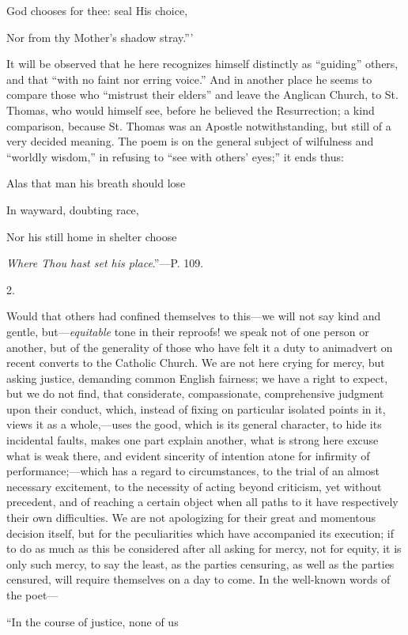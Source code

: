 God chooses for thee: seal His choice,

Nor from thy
Mother's shadow stray.'''

It will be observed that he here recognizes
himself distinctly as ``guiding'' others, and that ``with no faint nor
erring voice.'' And in another place he seems to compare those who ``mistrust
their elders'' and leave the Anglican Church, to St. Thomas, who would
himself see, before he believed the Resurrection; a kind comparison,
because St. Thomas was an Apostle notwithstanding, but still of a very
decided meaning. The poem is on the general subject of wilfulness and ``worldly
wisdom,'' in refusing to ``see with others' eyes;'' it ends thus:

Alas that
man his breath should lose

In wayward,
doubting race,

Nor his still home in shelter choose

\emph{Where
Thou hast set his place}.''—P. 109.

2.

Would that others had confined themselves to
this—we will not say kind and gentle, but—\emph{equitable} tone in
their reproofs! we speak not of one person or another, but of the
generality of those who have felt it a duty to animadvert on recent
converts to the Catholic Church. We are not here crying for mercy, but
asking justice, demanding common English fairness; we have a right to
expect, but we do not find, that considerate, compassionate,
comprehensive judgment upon their conduct, which, instead of fixing on
particular isolated points in it, views it as a whole,—uses the
good, which is its general character, to hide its incidental faults,
makes one part explain another, what is strong here excuse what is
weak there, and evident sincerity of intention atone for infirmity of
performance;—which has a regard to circumstances, to the trial of an
almost necessary excitement, to the necessity of acting beyond
criticism, yet without precedent, and of reaching a certain object
when all paths to it have respectively their own difficulties. We are
not apologizing for their great and momentous decision itself, but for
the peculiarities which have accompanied its execution; if to do as
much as this be considered after all asking for mercy, not for equity,
it is only such mercy, to say the least, as the parties censuring, as
well as the parties censured, will require themselves on a day to
come. In the well-known words of the poet—

``In
the course of justice, none of us

